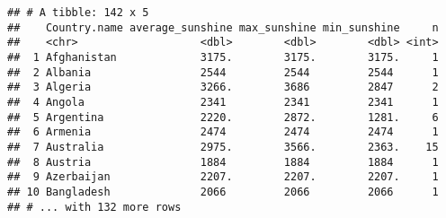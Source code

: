 \documentclass[
]{article}
\begin{document}
\begin{verbatim}
## # A tibble: 142 x 5
##    Country.name average_sunshine max_sunshine min_sunshine     n
##    <chr>                   <dbl>        <dbl>        <dbl> <int>
##  1 Afghanistan             3175.        3175.        3175.     1
##  2 Albania                 2544         2544         2544      1
##  3 Algeria                 3266.        3686         2847      2
##  4 Angola                  2341         2341         2341      1
##  5 Argentina               2220.        2872.        1281.     6
##  6 Armenia                 2474         2474         2474      1
##  7 Australia               2975.        3566.        2363.    15
##  8 Austria                 1884         1884         1884      1
##  9 Azerbaijan              2207.        2207.        2207.     1
## 10 Bangladesh              2066         2066         2066      1
## # ... with 132 more rows
\end{verbatim}
\end{document}
